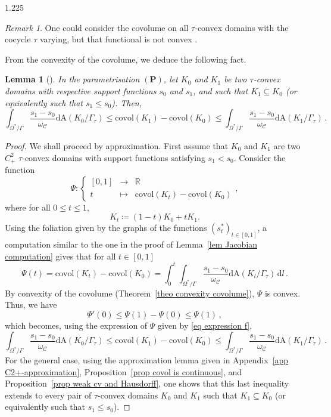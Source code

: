 \documentclass[reqno, a4paper]{amsart}
\numberwithin{equation}{section}
\numberwithin{figure}{section}
\newtheorem{lemma}[theorem]{Lemma}
\theoremstyle{definition}
\theoremstyle{remark}
\newtheorem{remark}[theorem]{Remark}
\newcommand{\R}{\mathbb{R}} %
\newcommand{\dif}{\mathrm{d}} %
\newcommand{\C}{\mathcal{C}} %
\newcommand{\covol}{\mathrm{covol}} %
\newcommand{\Area}{\mathrm{A}} %
\newcommand{\namelessfunction}[4]{ \left\lbrace \begin{matrix}
{#1} &\longrightarrow& {#2}\\
{#3} & \longmapsto & {#4}
\end{matrix} \right. }
\newcommand{\function}[5]{{#1}: \namelessfunction{#2}{#3}{#4}{#5}}
\begin{document}
\begin{spacing}{1.225}
\begin{remark}
One could consider the covolume on all $\tau$-convex domains with the cocycle $\tau$ varying, but that functional is not convex \cite[Remark 3.35]{Bonsante_Fillastre_17}.
\end{remark}

From the convexity of the covolume, we deduce the following fact. 

\begin{lemma}[{\cite[Lemma~3.36]{Bonsante_Fillastre_17}}]
\label{lem ineq covol}
In the parametrisation $(\mathbf{P})$, let $K_0$ and $K_1$ be two $\tau$-convex domains with respective support functions $s_0$ and $s_1$, and such that $K_1 \subseteq K_0$ (or equivalently such that $s_1 \leq s_0$). Then, 
 \begin{equation*}
 \int_{\Omega^*/\Gamma} \frac{s_1-s_0}{\omega_\C} \dif \Area(K_0/\Gamma_\tau) \leq \covol(K_1)-\covol(K_0) \leq \int_{\Omega^*/\Gamma} \frac{s_1-s_0}{\omega_\C} \dif \Area(K_1/\Gamma_\tau) \, . 
 \end{equation*}
\end{lemma}
\begin{proof}
We shall proceed by approximation. First assume that $K_0$ and $K_1$ are two $C^2_+$ $\tau$-convex domains with support functions satisfying $s_1<s_0$. Consider the function 
 \begin{equation*}
 \function{\Psi}{[0,1]}{\R}{t}{\covol(K_t)-\covol(K_0)},
 \end{equation*}
where for all $0 \leq t \leq 1$,
 \begin{equation*}
 K_t \coloneqq (1-t) K_0 + t K_1. 
 \end{equation*}
Using the foliation given by the graphs of the functions $(s_t^*)_{t\in[0,1]}$, a computation similar to the one in the proof of Lemma~\ref{lem Jacobian computation} gives that for all $t \in [0,1]$
 \begin{equation}
 \label{eq expression f}
 \Psi(t)=\covol(K_t)-\covol(K_0) = \int_0^t \int_{\Omega^*/\Gamma} \frac{s_1-s_0}{\omega_\C} \dif \Area(K_{l}/\Gamma_\tau) \, \dif l \, . 
 \end{equation}
By convexity of the covolume (Theorem~\ref{theo convexity covolume}), $\Psi$ is convex. Thus, we have
 \begin{equation*}
 \Psi'(0) \leq \Psi(1)-\Psi(0)\leq \Psi(1) \, ,
 \end{equation*}
which becomes, using the expression of $\Psi$ given by \eqref{eq expression f},
 \begin{equation*}
 \int_{\Omega^*/\Gamma} \frac{s_1-s_0}{\omega_\C} \dif \Area(K_0/\Gamma_\tau) \leq \covol(K_1)-\covol(K_0) \leq \int_{\Omega^*/\Gamma} \frac{s_1-s_0}{\omega_\C} \dif \Area(K_1/\Gamma_\tau) \, . 
 \end{equation*}
For the general case, using the approximation lemma given in Appendix~\ref{app C2+-approximation}, Proposition~\ref{prop covol is continuous}, and Proposition~\ref{prop weak cv and Hausdorff}, one shows that this last inequality extends to every pair of $\tau$-convex domains $K_0$ and $K_1$ such that $K_1 \subseteq K_0$ (or equivalently such that $s_1 \leq s_0$). 
\end{proof}


\end{spacing}
\end{document}
